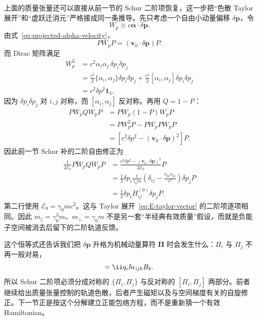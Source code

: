 上面的质量张量还可以直接从前一节的 Schur 二阶项恢复，这一步把“色散 Taylor 展开”和“虚跃迁消元”严格接成同一条推导。先只考虑一个自由小动量偏移 $\delta\bm p$，令
\begin{equation}
W_p\equiv c\bm\alpha\cdot\delta\bm p.
\end{equation}
由式~\eqref{eq:projected-alpha-velocity}，
\begin{equation}
PW_pP=(\bm v_0\cdot\delta\bm p)P.
\end{equation}
而 Dirac 矩阵满足
\begin{align}
W_p^2
&=c^2\alpha_i\alpha_j\,\delta p_i\delta p_j\\
&=\frac{c^2}{2}\{\alpha_i,\alpha_j\}\delta p_i\delta p_j
 +\frac{c^2}{2}[\alpha_i,\alpha_j]\delta p_i\delta p_j\\
&=c^2\delta p^2\mathbf 1_4,
\end{align}
因为 $\delta p_i\delta p_j$ 对 $i,j$ 对称，而 $[\alpha_i,\alpha_j]$ 反对称。再用 $Q=1-P$：
\begin{align}
PW_pQW_pP
&=PW_p(1-P)W_pP\\
&=PW_p^2P-PW_pPW_pP\\
&=\left[c^2\delta p^2-(\bm v_0\cdot\delta\bm p)^2\right]P.
\end{align}
因此前一节 Schur 补的二阶自由修正为
\begin{align}
\frac{1}{2\mathcal E_0}PW_pQW_pP
&=\frac{c^2\delta p^2-(\bm v_0\cdot\delta\bm p)^2}{2\mathcal E_0}P\\
&=\frac12\delta p_i
\frac{1}{\gamma_0m}
\left(\delta_{ij}-\frac{v_{0i}v_{0j}}{c^2}\right)
\delta p_j P\\
&=\frac12\delta p_iH_{ij}^{(0)}\delta p_jP.
\label{eq:schur-hessian-identity}
\end{align}
第二行使用 $\mathcal E_0=\gamma_0mc^2$。这与 Taylor 展开~\eqref{eq:E-taylor-vector} 的二阶项逐项相同。因此 $m_\parallel=\gamma_0^3m$、$m_\perp=\gamma_0m$ 不是另一套“半经典有效质量”假设，而就是负能子空间被消去后留下的二阶轨道反馈。

这个恒等式还告诉我们把 $\delta\bm p$ 升格为机械动量算符 $\bm\Pi$ 时会发生什么：$\Pi_i$ 与 $\Pi_j$ 不再一般对易，
\begin{equation}
[\Pi_i,\Pi_j]
=\ii q_{\rm e}\hbar\epsilon_{ijk}B_k.
\label{eq:Pi-commutator-B}
\end{equation}
所以 Schur 二阶项必须分成对称的 $\{\Pi_i,\Pi_j\}$ 与反对称的 $[\Pi_i,\Pi_j]$ 两部分。前者继续给出质量张量控制的轨道色散，后者产生磁矩以及与空间梯度有关的自旋修正。下一节正是按这个分解建立正能包络方程，而不是重新猜一个有效 Hamiltonian。



